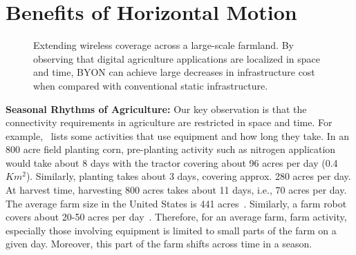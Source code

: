 
\section{Benefits of Horizontal Motion}
\label{sec:motion}

\begin{figure*}[t!] %
    \centering
    \hfill
    \hfill
\vspace{-0.15in}
\caption{Extending wireless coverage across a large-scale farmland. By observing that digital agriculture applications are localized in space and time, BYON can achieve large decreases in infrastructure cost when compared with conventional static infrastructure. }\vspace{-0.15in}
\label{fig:coverage}
\end{figure*}
\noindent\textbf{{Seasonal Rhythms of Agriculture:}} Our key observation is that the connectivity requirements in agriculture are restricted in space and time. For example,~\cite{iowaextension} lists some activities that use equipment and how long they take. In an 800 acre field planting corn, pre-planting activity such as nitrogen application would take about 8 days with the tractor covering about 96 acres per day (0.4 $Km^2$). Similarly, planting takes about 3 days, covering approx. 280 acres per day. At harvest time, harvesting 800 acres takes about 11 days, i.e., 70 acres per day. The average farm size in the United States is 441 acres~\cite{agcensus}. Similarly, a farm robot covers about 20-50 acres per day~\cite{laserweeds,airobotweeds}. Therefore,  for an average farm, farm activity, especially those involving equipment is limited to small parts of the farm on a given day. Moreover, this part of the farm shifts across time in a season.


